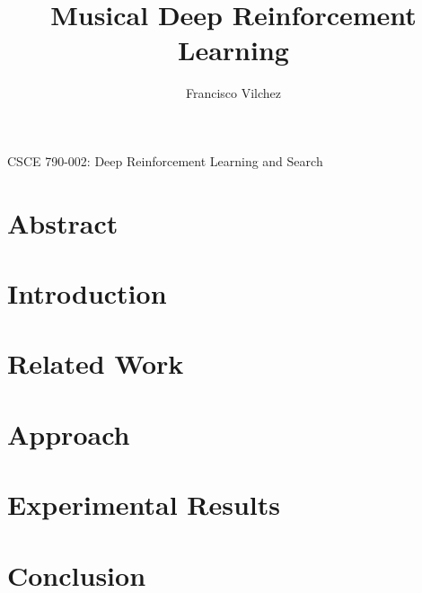 \documentclass[]{article}
\title{Musical Deep Reinforcement Learning}
\author{Francisco Vilchez}
\makeatletter
\renewcommand\maketitle {
  \begin{center}
    {\Large{\course}}
    \medskip\par\noindent
    {\Large\textbf{\@title}}
    \medskip\par\noindent
    {\Large\@author}
    \medskip\par\noindent
    {\Large\@date}
    \bigskip\par\noindent
  \end{center}
}
\newcommand{\course}{CSCE 790-002: Deep Reinforcement Learning and Search}
\makeatother
\begin{document}
\maketitle






\section*{Abstract}


\section*{Introduction}


\section*{Related Work}


\section*{Approach}


\section*{Experimental Results}


\section*{Conclusion}




\end{document}
